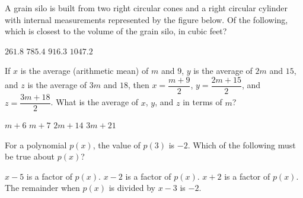 \question[1]
A grain silo is built from two right circular cones and a right circular cylinder with internal measurements represented by the figure below. Of the following, which is closest to the volume of the grain silo, in cubic feet?
\begin{center}
\end{center}

\begin{choices}
  \choice $261.8$
  \choice $785.4$
  \choice $916.3$
  \CorrectChoice $1047.2$
\end{choices}



\newpage



\question[1]
If $x$ is the average (arithmetic mean) of $m$ and $9$, $y$ is the average of $2m$ and $15$, and $z$ is the average of $3m$ and $18$, then $x = \dfrac{m + 9}{2}$, $y = \dfrac{2m + 15}{2}$, and $z = \dfrac{3m + 18}{2}$. What is the average of $x$, $y$, and $z$ in terms of $m$?
\begin{choices}
  \choice $m + 6$
  \CorrectChoice $m + 7$
  \choice $2m + 14$
  \choice $3m + 21$
\end{choices}



\question[1]
For a polynomial $p(x)$, the value of $p(3)$ is $-2$. Which of the following must be true about $p(x)$?
\begin{choices}
  \choice $x - 5$ is a factor of $p(x)$.
  \choice $x - 2$ is a factor of $p(x)$.
  \choice $x + 2$ is a factor of $p(x)$.
  \CorrectChoice The remainder when $p(x)$ is divided by $x - 3$ is $-2$.
\end{choices}




